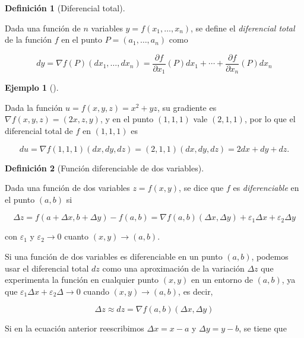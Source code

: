 \documentclass[
  a4paper,
]{scrreport}
\theoremstyle{plain}
\theoremstyle{plain}
\theoremstyle{definition}
\newtheorem{definition}{Definición}[chapter]
\theoremstyle{definition}
\newtheorem{example}{Ejemplo}[chapter]
\theoremstyle{plain}
\theoremstyle{definition}
\theoremstyle{remark}
\begin{document}
\begin{definition}[Diferencial
total]\protect\hypertarget{def-diferencial-total}{}\label{def-diferencial-total}

Dada una función de \(n\) variables \(y=f(x_1,\ldots,x_n)\), se define
el \emph{diferencial total} de la función \(f\) en el punto
\(P=(a_1, \ldots, a_n)\) como

\[
dy 
= \nabla f(P)(dx_1, \ldots, dx_n) 
= \frac{\partial f}{\partial x_1}(P)dx_1 + \cdots + \frac{\partial f}{\partial x_n}(P)dx_n
\]

\end{definition}

\begin{example}[]\protect\hypertarget{exm-diferencial-total}{}\label{exm-diferencial-total}

Dada la función \(u=f(x,y,z) = x^2+yz\), su gradiente es
\(\nabla f(x,y,z) = (2x, z, y)\), y en el punto \((1, 1, 1)\) vale
\((2, 1, 1)\), por lo que el diferencial total de \(f\) en \((1, 1, 1)\)
es

\[
du 
= \nabla f(1, 1, 1)(dx, dy, dz) 
= (2, 1, 1)(dx, dy, dz) 
= 2dx + dy + dz.
\]

\end{example}

\begin{definition}[Función diferenciable de dos
variables]\protect\hypertarget{def-funcion-2-variables-diferenciable}{}\label{def-funcion-2-variables-diferenciable}

Dada una función de dos variables \(z=f(x,y)\), se dice que \(f\) es
\emph{diferenciable} en el punto \((a,b)\) si

\[
\Delta z = f(a+\Delta x, b+\Delta y) - f(a,b) = \nabla f(a, b) (\Delta x, \Delta y) + \varepsilon_1 \Delta x + \varepsilon_2 \Delta y
\]

con \(\varepsilon_1\) y \(\varepsilon_2 \to 0\) cuanto
\((x,y)\to (a,b)\).

\end{definition}

Si una función de dos variables es diferenciable en un punto \((a,b)\),
podemos usar el diferencial total \(dz\) como una aproximación de la
variación \(\Delta z\) que experimenta la función en cualquier punto
\((x,y)\) en un entorno de \((a,b)\), ya que
\(\varepsilon_1 \Delta x + \varepsilon_2 \Delta \to 0\) cuando
\((x,y)\to (a,b)\), es decir,

\[
\Delta z \approx dz = \nabla f(a, b) (\Delta x, \Delta y)
\]

Si en la ecuación anterior reescribimos \(\Delta x = x-a\) y
\(\Delta y = y-b\), se tiene que
\end{document}

